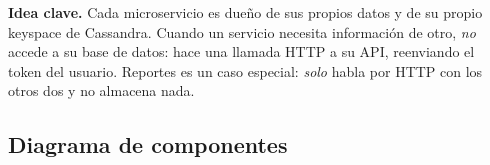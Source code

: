 \documentclass[11pt,a4paper]{article}
\begin{document}
\begin{nota}
\textbf{Idea clave.} Cada microservicio es dueño de sus propios datos y de su
propio keyspace de Cassandra. Cuando un servicio necesita información de otro,
\emph{no} accede a su base de datos: hace una llamada HTTP a su API, reenviando el
token del usuario. Reportes es un caso especial: \emph{solo} habla por HTTP con
los otros dos y no almacena nada.
\end{nota}

\subsection{Diagrama de componentes}
\end{document}
